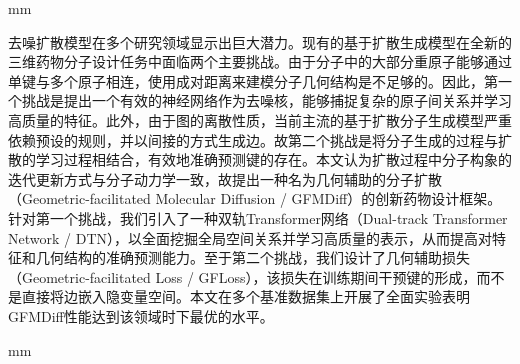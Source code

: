 \frontmatter
{}
\cfoot{\thepage}
\newpage
\begin{center}
\heiti{}
\end{center}
 mm
\begin{spacing}{1.5}
{\sihao 去噪扩散模型在多个研究领域显示出巨大潜力。现有的基于扩散生成模型在全新的三维药物分子设计任务中面临两个主要挑战。由于分子中的大部分重原子能够通过单键与多个原子相连，使用成对距离来建模分子几何结构是不足够的。因此，第一个挑战是提出一个有效的神经网络作为去噪核，能够捕捉复杂的原子间关系并学习高质量的特征。此外，由于图的离散性质，当前主流的基于扩散分子生成模型严重依赖预设的规则，并以间接的方式生成边。故第二个挑战是将分子生成的过程与扩散的学习过程相结合，有效地准确预测键的存在。本文认为扩散过程中分子构象的迭代更新方式与分子动力学一致，故提出一种名为几何辅助的分子扩散（Geometric-facilitated Molecular Diffusion / GFMDiff）的创新药物设计框架。针对第一个挑战，我们引入了一种双轨Transformer网络（Dual-track Transformer Network / DTN），以全面挖掘全局空间关系并学习高质量的表示，从而提高对特征和几何结构的准确预测能力。至于第二个挑战，我们设计了几何辅助损失（Geometric-facilitated Loss / GFLoss），该损失在训练期间干预键的形成，而不是直接将边嵌入隐变量空间。本文在多个基准数据集上开展了全面实验表明GFMDiff性能达到该领域时下最优的水平。}
\end{spacing}
 mm


